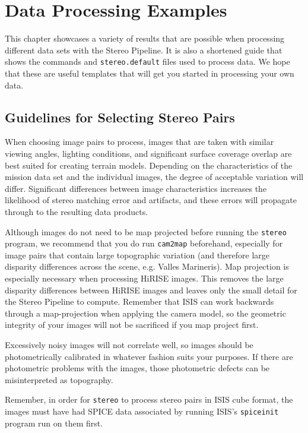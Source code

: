 \chapter{Data Processing Examples}
\label{ch:examples}

This chapter showcases a variety of results that are possible when
processing different data sets with the Stereo Pipeline. It is also
a shortened guide that shows the commands and \texttt{stereo.default}
files used to process data. We hope that these are useful templates
that will get you started in processing your own data.

\section{Guidelines for Selecting Stereo Pairs}

When choosing image pairs to process, images that are taken with
similar viewing angles, lighting conditions, and significant surface
coverage overlap are best suited for creating terrain
models. Depending on the characteristics of the mission data set and
the individual images, the degree of acceptable variation will
differ. Significant differences between image characteristics
increases the likelihood of stereo matching error and artifacts, and
these errors will propagate through to the resulting data products.

Although images do not need to be map projected before running the
\texttt{stereo} program, we recommend that you do run {\tt cam2map}
beforehand, especially for image pairs that contain large topographic
variation (and therefore large disparity differences across the
scene, e.g. Valles Marineris).  Map projection is especially necessary
when processing \ac{HiRISE} images. This removes the large disparity
differences between \ac{HiRISE} images and leaves only the small
detail for the Stereo Pipeline to compute. Remember that \ac{ISIS}
can work backwards through a map-projection when applying the camera
model, so the geometric integrity of your images will not be sacrificed
if you map project first.

Excessively noisy images will not correlate well, so images should be
photometrically calibrated in whatever fashion suits your purposes. If
there are photometric problems with the images, those photometric
defects can be misinterpreted as topography.

Remember, in order for \texttt{stereo} to process stereo pairs in
\ac{ISIS} cube format, the images must have had SPICE data associated
by running ISIS's \texttt{spiceinit} program run on them first.

